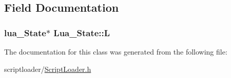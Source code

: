 \subsection{\-Field \-Documentation}
\hypertarget{classLua__State_adf1bf0d484862b5cbe63ba5215fdc498}{
\subsubsection[{\-L}]{\setlength{\rightskip}{0pt plus 5cm}lua\-\_\-\-State$\ast$ {\bf \-Lua\-\_\-\-State\-::\-L}}}\label{classLua__State_adf1bf0d484862b5cbe63ba5215fdc498}


\-The documentation for this class was generated from the following file\-:\begin{DoxyCompactItemize}
\item 
scriptloader/\hyperlink{ScriptLoader_8h}{\-Script\-Loader.\-h}\end{DoxyCompactItemize}
